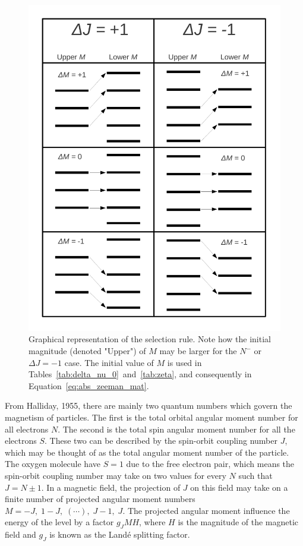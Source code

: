 \begin{figure}[ht!]
 \centering
 \includegraphics[width=343pt,keepaspectratio=true]{Selection_Rule.pdf}
 \begin{minipage}{312pt}
\vspace*{-0.8cm}
 \caption{Graphical representation of the selection rule. Note how the initial magnitude (denoted "Upper") of $M$ may be larger for the $N^{-}$ or $\Delta J = -1$ case. The initial value of $M$ is used in Tables~\ref{tab:delta_nu_0}~and~\ref{tab:zeta}, and consequently in Equation~\ref{eq:abs_zeeman_mat}.}
 \label{fig:zeeman_schematic}
\end{minipage}
\end{figure}

From Halliday, 1955, there are mainly two quantum numbers which govern the magnetism of particles. 
The first is the total orbital angular moment number for all electrons $N$. The second is the total spin angular moment number for all the electrons $S$. 
These two can be described by the spin-orbit coupling number $J$, which may be thought of as the total angular moment number of the particle. The oxygen molecule have $S=1$ due to the free electron pair, which means
the spin-orbit coupling number may take on two values for every $N$ such that $J=N\pm1$. 
In a magnetic field, the projection of $J$ on this field may take on a finite number of projected angular moment numbers $M = -J,\;1-J,\;(\cdots),\;J-1,\;J$. 
The projected angular moment influence the energy of the level by a factor $g_JMH$, where $H$ is the magnitude of the magnetic field and $g_J$ is known as the Landé splitting factor.

